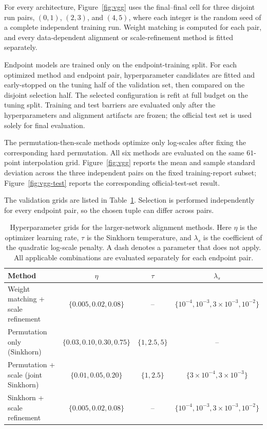 \documentclass[twoside]{article}
\begin{document}
For every architecture, Figure~\ref{fig:vgg} uses the final--final cell for
three disjoint run pairs, $(0,1)$, $(2,3)$, and $(4,5)$, where each integer is
the random seed of a complete independent training run.  Weight matching is
computed for each pair, and every data-dependent alignment or scale-refinement
method is fitted separately.

Endpoint models are trained only on the endpoint-training split.  For each
optimized method and endpoint pair, hyperparameter candidates are fitted and
early-stopped on the tuning half of the validation set, then compared on the
disjoint selection half.  The selected configuration is refit at full budget
on the tuning split.  Training and test barriers are evaluated only after the
hyperparameters and alignment artifacts are frozen; the official test set is
used solely for final evaluation.

The permutation-then-scale methods optimize only log-scales after fixing the
corresponding hard permutation.  All six methods are evaluated on the same
$61$-point interpolation grid.  Figure~\ref{fig:vgg} reports the mean and
sample standard deviation across the three independent pairs on the fixed
training-report subset; Figure~\ref{fig:vgg-test} reports the corresponding
official-test-set result.

The validation grids are listed in Table~\ref{tab:larger-network-hparams}.
Selection is performed independently for every endpoint pair, so the chosen
tuple can differ across pairs.
\begin{table}[H]
    \centering
    \small
    \begin{tabular}{lccc}
        \toprule
        Method & $\eta$ & $\tau$ & $\lambda_s$ \\
        \midrule
        Weight matching + scale refinement
        & $\{0.005,0.02,0.08\}$ & --
        & $\{10^{-4},10^{-3},3\!\times\!10^{-3},10^{-2}\}$ \\
        Permutation only (Sinkhorn)
        & $\{0.03,0.10,0.30,0.75\}$ & $\{1,2.5,5\}$ & -- \\
        Permutation + scale (joint Sinkhorn)
        & $\{0.01,0.05,0.20\}$ & $\{1,2.5\}$
        & $\{3\!\times\!10^{-4},3\!\times\!10^{-3}\}$ \\
        Sinkhorn + scale refinement
        & $\{0.005,0.02,0.08\}$ & --
        & $\{10^{-4},10^{-3},3\!\times\!10^{-3},10^{-2}\}$ \\
        \bottomrule
    \end{tabular}
    \caption{Hyperparameter grids for the larger-network alignment methods.
    Here $\eta$ is the optimizer learning rate, $\tau$ is the Sinkhorn
    temperature, and $\lambda_s$ is the coefficient of the quadratic
    log-scale penalty.  A dash denotes a parameter that does not apply.  All
    applicable combinations are evaluated separately for each endpoint pair.}
    \label{tab:larger-network-hparams}
\end{table}
\end{document}
